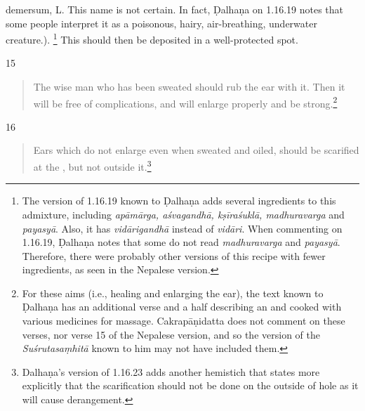 \begin{translation}
{        demersum, L. 
        This name is not
    certain. In fact, Ḍalhaṇa on 1.16.19 \citep[79]{vulgate} notes that some people interpret it as a poisonous, hairy, air-breathing, underwater creature.}).%
    \footnote{The version of 1.16.19 known to Ḍalhaṇa \citep[79]{vulgate} adds several 
    ingredients to this admixture, including \emph{apāmārga, aśvagandhā, 
    kṣīraśuklā, madhuravarga} and \emph{payasyā}. Also, it has 
    \emph{vidārigandhā} instead of \emph{vidāri}. When commenting on 1.16.19, 
    Ḍalhaṇa \citep[79]{vulgate} notes that some do not read 
    \emph{madhuravarga} and \emph{payasyā}. Therefore, there were probably 
    other versions of this recipe with fewer ingredients, as seen in the Nepalese 
    version.}
    This should then be deposited in a well-protected spot.
    
    \item[15]%
    \begin{verse}
        
        The wise man who has been sweated should rub the  ear with 
        it. 
        Then it will be free of complications, and will enlarge properly and be strong.\footnote{For these aims (i.e., healing and enlarging the ear), the text known to Ḍalhaṇa \citep[79]{vulgate} has an additional verse and a half describing an  and  cooked with various medicines for massage. Cakrapāṇidatta \citep[131]{acar-1939} does not comment on these verses, nor verse 15 of the Nepalese version, and so the version of the \emph{Suśrutasaṃhitā} known to him may not have included them.}
    \end{verse}
    
    \item[16]
        \begin{verse}
    Ears which do not enlarge even when sweated and oiled, 
    should be scarified
    at the , but not outside it.\footnote{Dalhaṇa's version of 
    1.16.23 adds another hemistich that states more explicitly that the scarification should not 
    be done on the outside of hole as it will cause derangement.}  
        \end{verse}
    

\end{translation}
